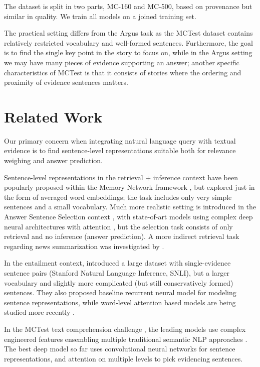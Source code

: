 \documentclass[11pt]{article}
\begin{document}
The dataset is split in two parts, MC-160 and MC-500, based on provenance but
similar in quality.
We train all models on a joined training set.

The practical setting differs from the Argus task as the MCTest dataset contains
relatively restricted vocabulary and well-formed sentences. Furthermore,
the goal is to find the single key point in the story to focus on, while
in the Argus setting we may have many pieces of evidence supporting an answer;
another specific characteristics of MCTest is that it consists of stories
where the ordering and proximity of evidence sentences matters.


\section{Related Work}
\label{sec:relwork}

Our primary concern when integrating natural language query with
textual evidence is to find sentence-level representations suitable
both for relevance weighing and answer prediction.

Sentence-level representations in the retrieval + inference context have been
popularly proposed within the Memory Network framework \cite{MemNN},
but explored just in the form of averaged word embeddings; the task includes
only very simple sentences and a small vocabulary.
Much more realistic setting is introduced in the Answer Sentence Selection
context \cite{AnsselWang} \cite{sps}, with state-of-art models using complex
deep neural architectures with attention \cite{attnpooling}, but the selection
task consists of only retrieval and no inference (answer prediction).
A more indirect retrieval task regarding news summarization was investigated
by \cite{AttSum}.

In the entailment context, \cite{SNLI} introduced a large dataset
with single-evidence sentence pairs (Stanford Natural Language Inference, SNLI),
but a larger vocabulary and
slightly more complicated (but still conservatively formed) sentences.
They also proposed baseline recurrent neural model for modeling
sentence representations, while word-level attention based models
are being studied more recently \cite{SNLIattn} \cite{LSTMMR}.


In the MCTest text comprehension challenge \cite{MCTest}, the
leading models use complex engineered features ensembling multiple traditional
semantic NLP approaches \cite{MCWang}. The best deep model so far
\cite{HABCNN} uses convolutional neural networks for sentence
representations, and attention on multiple levels to pick evidencing
sentences.
\end{document}
